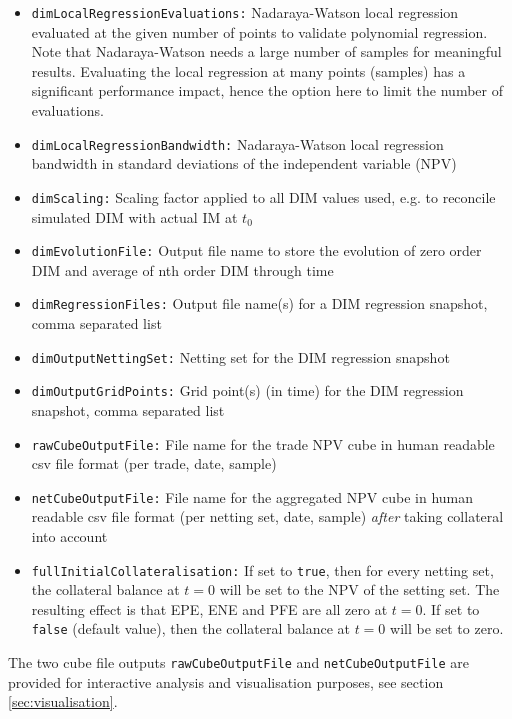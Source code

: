 \documentclass[12pt, a4paper]{article}
\begin{document}
{\begin{itemize}
  AggregationScenarioDataIndices sections (only these scenario data are passed on to the post processor); if the list is
  empty, the NPV will be used as a single regressor
\item {\tt dimLocalRegressionEvaluations:} Nadaraya-Watson local regression evaluated at the given number of points to
validate polynomial regression. Note that Nadaraya-Watson needs a large number of samples for meaningful
results. Evaluating the local regression at many points (samples) has a significant performance impact, hence the option
here to limit the number of evaluations.
\item {\tt dimLocalRegressionBandwidth:} Nadaraya-Watson local regression bandwidth in standard deviations of the
independent variable (NPV)
\item {\tt dimScaling:} Scaling factor applied to all DIM values used, e.g. to reconcile simulated DIM with actual IM at
$t_0$
\item {\tt dimEvolutionFile:} Output file name to store the evolution of zero order DIM and average of nth order DIM
through time
\item {\tt dimRegressionFiles:} Output file name(s) for a DIM regression snapshot, comma separated list
\item {\tt dimOutputNettingSet:} Netting set for the DIM regression snapshot
\item {\tt dimOutputGridPoints:} Grid point(s) (in time) for the DIM regression snapshot, comma separated list
\item {\tt rawCubeOutputFile:} File name for the trade NPV cube in human readable csv file format (per trade, date,
sample)
\item {\tt netCubeOutputFile:} File name for the aggregated NPV cube in human readable csv file format (per netting set,
date, sample) {\em after} taking collateral into account
\item {\tt fullInitialCollateralisation:} If set to {\tt true}, then for every netting set, the collateral balance at $t=0$ will be set to the NPV of the setting set. The resulting effect is that EPE, ENE and PFE are all zero at $t=0$. If set to {\tt false} (default value), then the collateral balance at $t=0$ will be set to zero.
\end{itemize}

The two cube file outputs {\tt rawCubeOutputFile} and {\tt netCubeOutputFile} are provided for interactive analysis and visualisation purposes, see section
\ref{sec:visualisation}.

}
\end{document}
